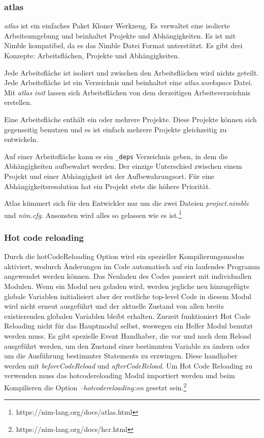 \documentclass[11pt]{report}
\begin{document}
\subsubsection{atlas}
\emph{atlas} ist ein einfaches Paket Kloner Werkzeug. Es verwaltet eine isolierte Arbeitsumgebung und beinhaltet Projekte und Abhängigkeiten. Es ist mit Nimble kompatibel, da es das Nimble Datei Format unterstützt.
Es gibt drei Konzepte: Arbeitsflächen, Projekte und Abhängigkeiten.

Jede Arbeitsfläche ist isoliert und zwischen den Arbeitsflächen wird nichts geteilt. Jede Arbeitsfläche ist ein Verzeichnis und beinhaltet eine \emph{atlas.workspace} Datei. Mit \emph{atlas init} lassen sich Arbeitsflächen von dem derzeitigen Arbeitsverzeichnis erstellen.

Eine Arbeitsfläche enthält ein oder mehrere Projekte. Diese Projekte können sich gegenseitig benutzen und es ist einfach mehrere Projekte gleichzeitig zu entwickeln.

Auf einer Arbeitsfläche kann es ein \verb|_deps| Verzeichnis geben, in dem die Abhängigkeiten aufbewahrt werden. Der einzige Unterschied zwischen einem Projekt und einer Abhängigkeit ist der Aufbewahrungsort. Für eine Abhängigkeitsresolution hat ein Projekt stets die höhere Priorität.

Atlas kümmert sich für den Entwickler nur um die zwei Dateien \emph{project.nimble} und \emph{nim.cfg}. Ansonsten wird alles so gelassen wie es ist.\footnote{https://nim-lang.org/docs/atlas.html}

\subsubsection{Hot code reloading}
Durch die hotCodeReloading Option wird ein spezieller Kompilierungsmodus aktiviert, wodurch Änderungen im Code automatisch auf ein laufendes Programm angewendet werden können. Das Neuladen des Codes passiert mit individuallen Modulen. Wenn ein Modul neu geladen wird, werden jegliche neu hinzugefügte globale Variablen initialisiert aber der restliche top-level Code in diesem Modul wird nicht erneut ausgeführt und der aktuelle Zustand von allen breits existierenden globalen Variablen bleibt erhalten. Zurzeit funktioniert Hot Code Reloading nicht für das Hauptmodul selbst, weswegen ein Helfer Modul benutzt werden muss. Es gibt spezielle Event Handhaber, die vor und nach dem Reload ausgeführt werden, um den Zustand einer bestimmten Variable zu ändern oder um die Ausführung bestimmter Statements zu erzwingen. Diese handhaber werden mit \emph{beforeCodeReload} und \emph{afterCodeReload}. Um Hot Code Reloading zu verwenden muss das hotcodereloading Modul importiert werden und beim Kompilieren die Option \emph{--hotcodereloading:on} gesetzt sein.\footnote{https://nim-lang.org/docs/hcr.html}
\end{document}
